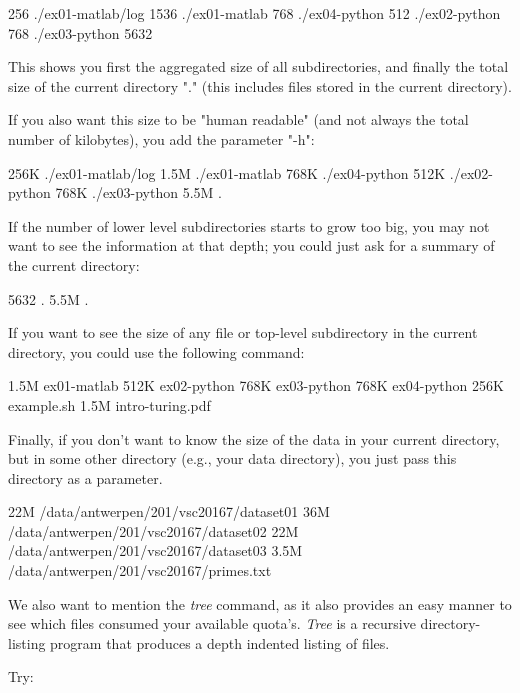\begin{prompt}
256 ./ex01-matlab/log
1536 ./ex01-matlab
768 ./ex04-python
512 ./ex02-python
768 ./ex03-python
5632
\end{prompt}

This shows you first the aggregated size of all subdirectories, and finally the
total size of the current directory "." (this includes files stored in the
current directory).

If you also want this size to be "human readable" (and not always the total
number of kilobytes), you add the parameter "-h":

\begin{prompt}
256K ./ex01-matlab/log
1.5M ./ex01-matlab
768K ./ex04-python
512K ./ex02-python
768K ./ex03-python
5.5M .
\end{prompt}

If the number of lower level subdirectories starts to grow too big, you may not
want to see the information at that depth; you could just ask for a summary of
the current directory:

\begin{prompt}
5632 .
5.5M .
\end{prompt}

If you want to see the size of any file or top-level subdirectory in the
current directory, you could use the following command:

\begin{prompt}
1.5M ex01-matlab
512K ex02-python
768K ex03-python
768K ex04-python
256K example.sh
1.5M intro-turing.pdf
\end{prompt}


Finally, if you don't want to know the size of the data in your current
directory, but in some other directory (e.g., your data directory), you just
pass this directory as a parameter.

\begin{prompt}
22M /data/antwerpen/201/vsc20167/dataset01
36M /data/antwerpen/201/vsc20167/dataset02
22M /data/antwerpen/201/vsc20167/dataset03
3.5M /data/antwerpen/201/vsc20167/primes.txt
\end{prompt}

We also want to mention the \emph{tree} command, as it also provides an easy
manner to see which files consumed your available quota's. \emph{Tree} is a
recursive directory-listing program that produces a depth indented listing of
files.

Try:

\begin{prompt}
\end{prompt}

